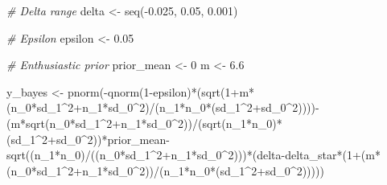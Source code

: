 \documentclass[
]{book}
\newenvironment{Shaded}{\begin{snugshade}}{\end{snugshade}}
\newcommand{\CommentTok}[1]{\textcolor[rgb]{0.56,0.35,0.01}{\textit{#1}}}
\newcommand{\DecValTok}[1]{\textcolor[rgb]{0.00,0.00,0.81}{#1}}
\newcommand{\FloatTok}[1]{\textcolor[rgb]{0.00,0.00,0.81}{#1}}
\newcommand{\FunctionTok}[1]{\textcolor[rgb]{0.00,0.00,0.00}{#1}}
\newcommand{\NormalTok}[1]{#1}
\newcommand{\OtherTok}[1]{\textcolor[rgb]{0.56,0.35,0.01}{#1}}
\newcommand{\SpecialCharTok}[1]{\textcolor[rgb]{0.00,0.00,0.00}{#1}}
\begin{document}
\begin{Shaded}
\begin{Highlighting}[]
\CommentTok{\# Delta range}
\NormalTok{delta }\OtherTok{\textless{}{-}} \FunctionTok{seq}\NormalTok{(}\SpecialCharTok{{-}}\FloatTok{0.025}\NormalTok{, }\FloatTok{0.05}\NormalTok{, }\FloatTok{0.001}\NormalTok{)}

\CommentTok{\# Epsilon}
\NormalTok{epsilon }\OtherTok{\textless{}{-}} \FloatTok{0.05}

\CommentTok{\# Enthusiastic prior}
\NormalTok{prior\_mean }\OtherTok{\textless{}{-}} \DecValTok{0}
\NormalTok{m }\OtherTok{\textless{}{-}} \FloatTok{6.6}

\NormalTok{y\_bayes }\OtherTok{\textless{}{-}} \FunctionTok{pnorm}\NormalTok{(}\SpecialCharTok{{-}}\FunctionTok{qnorm}\NormalTok{(}\DecValTok{1}\SpecialCharTok{{-}}\NormalTok{epsilon)}\SpecialCharTok{*}\NormalTok{(}\FunctionTok{sqrt}\NormalTok{(}\DecValTok{1}\SpecialCharTok{+}\NormalTok{m}\SpecialCharTok{*}\NormalTok{(n\_0}\SpecialCharTok{*}\NormalTok{sd\_1}\SpecialCharTok{\^{}}\DecValTok{2}\SpecialCharTok{+}\NormalTok{n\_1}\SpecialCharTok{*}\NormalTok{sd\_0}\SpecialCharTok{\^{}}\DecValTok{2}\NormalTok{)}\SpecialCharTok{/}\NormalTok{(n\_1}\SpecialCharTok{*}\NormalTok{n\_0}\SpecialCharTok{*}\NormalTok{(sd\_1}\SpecialCharTok{\^{}}\DecValTok{2}\SpecialCharTok{+}\NormalTok{sd\_0}\SpecialCharTok{\^{}}\DecValTok{2}\NormalTok{))))}\SpecialCharTok{{-}}\NormalTok{(m}\SpecialCharTok{*}\FunctionTok{sqrt}\NormalTok{(n\_0}\SpecialCharTok{*}\NormalTok{sd\_1}\SpecialCharTok{\^{}}\DecValTok{2}\SpecialCharTok{+}\NormalTok{n\_1}\SpecialCharTok{*}\NormalTok{sd\_0}\SpecialCharTok{\^{}}\DecValTok{2}\NormalTok{))}\SpecialCharTok{/}\NormalTok{(}\FunctionTok{sqrt}\NormalTok{(n\_1}\SpecialCharTok{*}\NormalTok{n\_0)}\SpecialCharTok{*}\NormalTok{(sd\_1}\SpecialCharTok{\^{}}\DecValTok{2}\SpecialCharTok{+}\NormalTok{sd\_0}\SpecialCharTok{\^{}}\DecValTok{2}\NormalTok{))}\SpecialCharTok{*}\NormalTok{prior\_mean}\SpecialCharTok{{-}}\FunctionTok{sqrt}\NormalTok{((n\_1}\SpecialCharTok{*}\NormalTok{n\_0)}\SpecialCharTok{/}\NormalTok{((n\_0}\SpecialCharTok{*}\NormalTok{sd\_1}\SpecialCharTok{\^{}}\DecValTok{2}\SpecialCharTok{+}\NormalTok{n\_1}\SpecialCharTok{*}\NormalTok{sd\_0}\SpecialCharTok{\^{}}\DecValTok{2}\NormalTok{)))}\SpecialCharTok{*}\NormalTok{(delta}\SpecialCharTok{{-}}\NormalTok{delta\_star}\SpecialCharTok{*}\NormalTok{(}\DecValTok{1}\SpecialCharTok{+}\NormalTok{(m}\SpecialCharTok{*}\NormalTok{(n\_0}\SpecialCharTok{*}\NormalTok{sd\_1}\SpecialCharTok{\^{}}\DecValTok{2}\SpecialCharTok{+}\NormalTok{n\_1}\SpecialCharTok{*}\NormalTok{sd\_0}\SpecialCharTok{\^{}}\DecValTok{2}\NormalTok{))}\SpecialCharTok{/}\NormalTok{(n\_1}\SpecialCharTok{*}\NormalTok{n\_0}\SpecialCharTok{*}\NormalTok{(sd\_1}\SpecialCharTok{\^{}}\DecValTok{2}\SpecialCharTok{+}\NormalTok{sd\_0}\SpecialCharTok{\^{}}\DecValTok{2}\NormalTok{)))))}


\end{Highlighting}
\end{Shaded}
\end{document}
